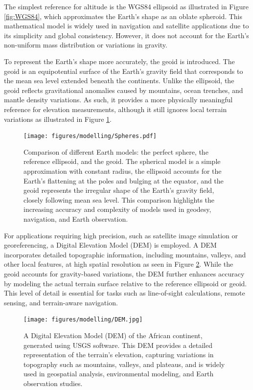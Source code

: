 \noindent The simplest reference for altitude is the WGS84 ellipsoid as illustrated in Figure \ref{fig:WGS84}, which approximates the Earth's shape as an oblate spheroid. This mathematical model 
is widely used in navigation and satellite applications due to its simplicity and global consistency. However, it does not account for the Earth's non-uniform 
mass distribution or variations in gravity.
\vspace{0.5cm}

\noindent To represent the Earth's shape more accurately, the geoid is introduced. The geoid is an equipotential surface of the Earth's gravity field that 
corresponds to the mean sea level extended beneath the continents. Unlike the ellipsoid, the geoid reflects gravitational anomalies caused by mountains, 
ocean trenches, and mantle density variations. As such, it provides a more physically meaningful reference for elevation measurements, although it still 
ignores local terrain variations as illustrated in Figure \ref{fig:oids}.

\begin{figure}[H]
    \centering
    \texttt{[image: figures/modelling/Spheres.pdf]}
    \caption{Comparison of different Earth models: the perfect sphere, the reference ellipsoid, and the geoid. The spherical model is a simple approximation with constant radius, the ellipsoid accounts for the Earth’s flattening at the poles and bulging at the equator, and the geoid represents the irregular shape of the Earth’s gravity field, closely following mean sea level. This comparison highlights the increasing accuracy and complexity of models used in geodesy, navigation, and Earth observation.}
    \label{fig:oids}
\end{figure}

\noindent For applications requiring high precision, such as satellite image simulation or georeferencing, a Digital Elevation Model (DEM) is employed. 
A DEM incorporates detailed topographic information, including mountains, valleys, and other local features, at high spatial resolution as seen in Figure \ref{fig:DEMS}. While the geoid 
accounts for gravity-based variations, the DEM further enhances accuracy by modeling the actual terrain surface relative to the reference ellipsoid or geoid. This level of detail is essential for tasks such as line-of-sight calculations, remote sensing, and terrain-aware navigation.

\begin{figure}[H]
    \centering
    \texttt{[image: figures/modelling/DEM.jpg]}
    \caption{A Digital Elevation Model (DEM) of the African continent, generated using USGS software. This DEM provides a detailed representation of the terrain's elevation, capturing variations in topography such as mountains, valleys, and plateaus, and is widely used in geospatial analysis, environmental modeling, and Earth observation studies.}
    \label{fig:DEMS}
\end{figure}

